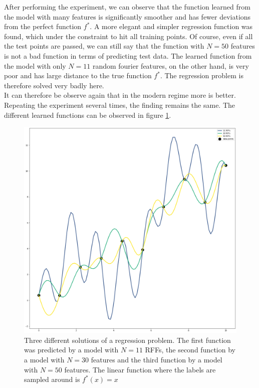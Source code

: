 After performing the experiment, we can observe that the function learned from the model with many features is significantly smoother and has fewer deviations from the perfect function $f^*$. A more elegant and simpler regression function was found, which under the constraint to hit all training points. Of course, even if all the test points are passed, we can still say that the function with $N = 50$ features is not a bad function in terms of predicting test data.
The learned function from the model with only $N = 11$ random fourier features, on the other hand, is very poor and has large distance to the true function $f^*$. The regression problem is therefore solved very badly here. \\
 It can therefore be observe again that in the modern regime more is better. Repeating the experiment several times, the finding remains the same. The different learned functions can be observed in figure \ref{fig:1d_rff}. \\

\begin{figure}[!htp]
\centering
\includegraphics[scale=0.3]{Abschlussarbeit_2021/LaTeX/images/RFF_1d.png}
\caption{Three different solutions of a regression problem. The first function was predicted by a model with $N = 11$ RFFs, the second function by a model with $N = 30$ features and the third function by a model with $N = 50$ features. The linear function where the labels are sampled around is $f^*(x) = x$ }
\label{fig:1d_rff}
\end{figure}

